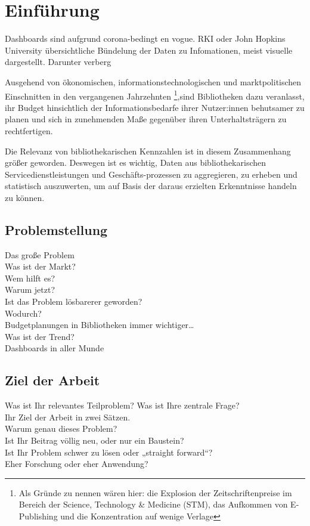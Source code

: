 \chapter{Einführung}
Dashboards sind aufgrund corona-bedingt en vogue.
RKI oder John Hopkins University
übersichtliche Bündelung der Daten zu Infomationen, meist visuelle dargestellt.
Darunter verberg


Ausgehend von ökonomischen, informationstechnologischen und marktpolitischen Einschnitten in den
vergangenen Jahrzehnten \footnote{Als Gründe zu nennen wären hier: die Explosion der Zeitschriftenpreise im Bereich der
Science, Technology \& Medicine (STM), das Aufkommen von E-Publishing und die Konzentration auf wenige
Verlage},sind Bibliotheken dazu veranlasst, ihr Budget hinsichtlich der Informationsbedarfe
ihrer Nutzer:innen behutsamer zu planen und sich in zunehmenden Maße gegenüber ihren Unterhaltsträgern zu rechtfertigen.

Die Relevanz von bibliothekarischen Kennzahlen ist in diesem Zusammenhang größer geworden.
Deswegen ist es wichtig, Daten aus bibliothekarischen Servicedienstleistungen und Geschäfts-prozessen zu aggregieren, zu erheben und statistisch
auszuwerten, um auf Basis der daraus erzielten Erkenntnisse handeln zu können.

\section{Problemstellung}

Das große Problem\\
Was ist der Markt?\\
Wem hilft es?\\
Warum jetzt?\\
Ist das Problem lösbarerer geworden?\\
Wodurch?\\
Budgetplanungen in Bibliotheken immer wichtiger…\\
Was ist der Trend?\\
Dashboards in aller Munde


\section{Ziel der Arbeit}

Was ist Ihr relevantes Teilproblem? Was ist Ihre zentrale Frage?\\
Ihr Ziel der Arbeit in zwei Sätzen.\\
Warum genau dieses Problem?\\
Ist Ihr Beitrag völlig neu, oder nur ein Baustein?\\
Ist Ihr Problem schwer zu lösen oder „straight forward“?\\
Eher Forschung oder eher Anwendung?\\

